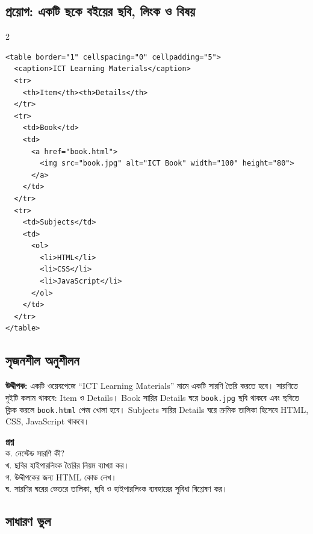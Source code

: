 
\subsection{প্রয়োগ: একটি ছকে বইয়ের ছবি, লিংক ও বিষয়}


\par{}\par
\begin{multicols}{2}
\begin{verbatim}
<table border="1" cellspacing="0" cellpadding="5">
  <caption>ICT Learning Materials</caption>
  <tr>
    <th>Item</th><th>Details</th>
  </tr>
  <tr>
    <td>Book</td>
    <td>
      <a href="book.html">
        <img src="book.jpg" alt="ICT Book" width="100" height="80">
      </a>
    </td>
  </tr>
  <tr>
    <td>Subjects</td>
    <td>
      <ol>
        <li>HTML</li>
        <li>CSS</li>
        <li>JavaScript</li>
      </ol>
    </td>
  </tr>
</table>
\end{verbatim}
\end{multicols}



\subsection{সৃজনশীল অনুশীলন}

\begin{practicebox}
\textbf{উদ্দীপক:} একটি ওয়েবপেজে ``ICT Learning Materials'' নামে একটি সারণি তৈরি করতে হবে। সারণিতে দুইটি কলাম থাকবে: Item ও Details। Book সারির Details ঘরে \texttt{book.jpg} ছবি থাকবে এবং ছবিতে ক্লিক করলে \texttt{book.html} পেজ খোলা হবে। Subjects সারির Details ঘরে ক্রমিক তালিকা হিসেবে HTML, CSS, JavaScript থাকবে।

\textbf{প্রশ্ন}\\
ক. নেস্টেড সারণি কী?\\
খ. ছবির হাইপারলিংক তৈরির নিয়ম ব্যাখ্যা কর।\\
গ. উদ্দীপকের জন্য HTML কোড লেখ।\\
ঘ. সারণির ঘরের ভেতরে তালিকা, ছবি ও হাইপারলিংক ব্যবহারের সুবিধা বিশ্লেষণ কর।
\end{practicebox}

\subsection{সাধারণ ভুল}

